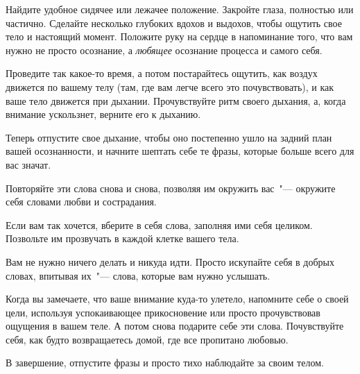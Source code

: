 \begin{itemize}
	\itemdiamondsuit Найдите удобное сидячее или лежачее положение. Закройте глаза, полностью или частично. Сделайте несколько глубоких вдохов и выдохов, чтобы ощутить свое тело и настоящий момент. Положите руку на сердце в напоминание того, что вам нужно не просто осознание, а \emph{любящее} осознание процесса и самого себя.
	
	\itemdiamondsuit Проведите так какое-то время, а потом постарайтесь ощутить, как воздух движется по вашему телу (там, где вам легче всего это почувствовать), и как ваше тело движется при дыхании. Прочувствуйте ритм своего дыхания, а, когда внимание ускользнет, верните его к дыханию.
	
	\itemdiamondsuit Теперь отпустите свое дыхание, чтобы оно постепенно ушло на задний план вашей осознанности, и начните шептать себе те фразы, которые больше всего для вас значат.
	
	\itemdiamondsuit Повторяйте эти слова снова и снова, позволяя им окружить вас~"--- окружите себя словами любви и сострадания.
	
	\itemdiamondsuit Если вам так хочется, вберите в себя слова, заполняя ими себя целиком. Позвольте им прозвучать в каждой клетке вашего тела.
	
	\itemdiamondsuit Вам не нужно ничего делать и никуда идти. Просто искупайте себя в добрых словах, впитывая их~"--- слова, которые вам нужно услышать.
	
	\itemdiamondsuit Когда вы замечаете, что ваше внимание куда-то улетело, напомните себе о своей цели, используя успокаивающее прикосновение или просто прочувствовав ощущения в вашем теле. А потом снова подарите себе эти слова. Почувствуйте себя, как будто возвращаетесь домой, где все пропитано любовью.
	
	\itemdiamondsuit В завершение, отпустите фразы и просто тихо наблюдайте за своим телом.
\end{itemize}

